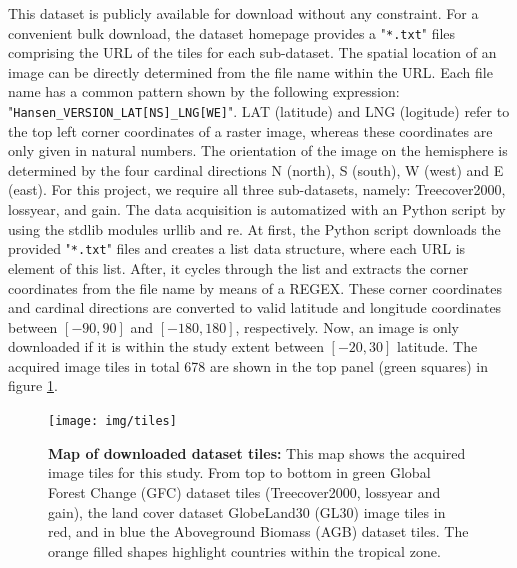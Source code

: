 		This dataset is publicly available for download without any constraint. For a convenient bulk download, the dataset homepage provides a "\verb|*.txt|" files comprising the \ac{URL} of the tiles for each sub-dataset. The spatial location of an image can be directly determined from the file name within the \ac{URL}. Each file name has a common pattern shown by the following expression: "\verb|Hansen_VERSION_LAT[NS]_LNG[WE]|". LAT (latitude) and LNG (logitude) refer to the top left corner coordinates of a raster image, whereas these coordinates are only given in natural numbers. The orientation of the image on the hemisphere is determined by the four cardinal directions N (north), S (south), W (west) and E (east). For this project, we require all three sub-datasets, namely: Treecover2000, lossyear, and gain. The data acquisition is automatized with an Python script by using the \ac{stdlib} modules urllib and re. At first, the Python script downloads the provided "\verb|*.txt|" files and creates a list data structure, where each \ac{URL} is element of this list. After, it cycles through the list and extracts the corner coordinates from the file name by means of a \ac{REGEX}. These corner coordinates and cardinal directions are converted to valid latitude and longitude coordinates between $[-90, 90]$ and $[-180, 180]$, respectively. Now, an image is only downloaded if it is within the study extent between $[-20, 30]$ latitude. The acquired image tiles in total 678 are shown in the top panel (green squares) in figure \ref{fig:tiles}. 
		\begin{figure}[ht]
			\centering
			\texttt{[image: img/tiles]}
			\caption[Map of downloaded dataset tiles]{\textbf{Map of downloaded dataset tiles:} This map shows the acquired image tiles for this study. From top to bottom in green Global Forest Change (GFC) dataset tiles (Treecover2000, lossyear and gain), the land cover dataset GlobeLand30 (GL30) image tiles in red, and in blue the Aboveground Biomass (AGB) dataset tiles. The orange filled shapes highlight countries within the tropical zone.}
			\label{fig:tiles}
		\end{figure}

